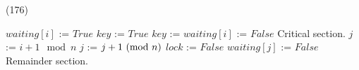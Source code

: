 \begin{theorem}{(176)}
\begin{itemize}
\begin{itemize}
\begin{algorithm}[H]
\begin{algorithmic}[1]
                        \Repeat
                            \State $waiting[i]$ := $True$
                            \State $key$ := $True$ 
                                \State $key$ := 
                            \EndWhile
                            \State $waiting[i]$ := $False$
                            \State Critical section.
                            \State $j$ := $i + 1 \mod{n}$
                             
                                \State $j$ := $j + 1 \ (\mathrm{mod}\ n)$
                            \EndWhile
                             
                                \State $lock$ := $False$
                            \Else 
                                \State $waiting[j]$ := $False$
                            \EndIf
                            \State Remainder section.
                    \EndFunction
                \end{algorithmic}
            \end{algorithm}
        \end{itemize}
    \end{itemize}
\end{theorem}

